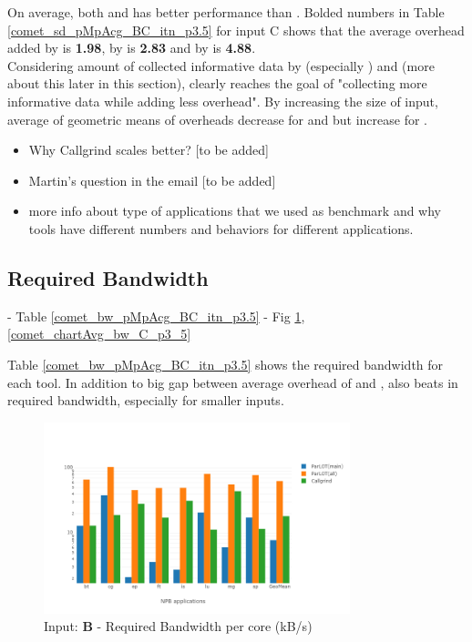  
 
On average, both \parlotm and \parlota has better performance than \callgrind. Bolded numbers in Table \ref{comet_sd_pMpAcg_BC_itn_p3.5} for input C shows that the average overhead added by \parlotm is \textbf{1.98}, by \parlota is \textbf{2.83} and by \callgrind is \textbf{4.88}. 
\\
Considering amount of collected informative data by \parlot (especially \parlota) and \callgrind (more about this later in this section), clearly \parlot reaches the goal of "collecting more informative data while adding less overhead".
By increasing the size of input, average of geometric means of overheads decrease for \parlotm and \parlota but increase for \callgrind. 

\begin{itemize}
\item Why Callgrind scales better? [to be added]
\item Martin's question in the email [to be added]
\item more info about type of applications that we used as benchmark and why tools have different numbers and behaviors for different applications.
\end{itemize}





  
\subsection{Required Bandwidth}
\label{subsec:lowbw}
 - Table \ref{comet_bw_pMpAcg_BC_itn_p3.5}
  - Fig \ref{comet_chartAvg_bw_B_p3_5}, \ref{comet_chartAvg_bw_C_p3_5}




Table \ref{comet_bw_pMpAcg_BC_itn_p3.5} shows the required bandwidth for each tool. 
In addition to big gap between average overhead of \parlotm and \callgrind, \parlotm also beats \callgrind in required bandwidth, especially for smaller inputs.

\begin{figure}[!t]
\centering
\includegraphics[width=3.5in]{figs.comet/comet_chartAvg_bw_B_p3_5.png}
\caption{ Input: \textbf{B} - Required Bandwidth per core (kB/s)
}
\label{comet_chartAvg_bw_B_p3_5}
\end{figure}



